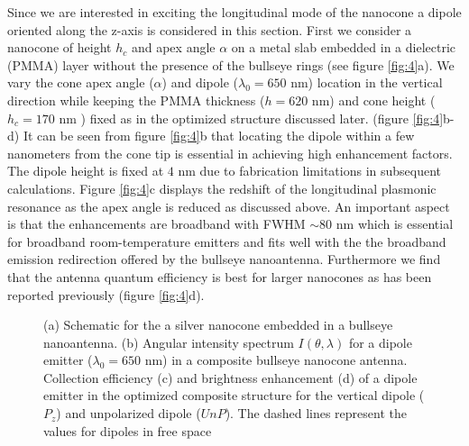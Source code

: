 \documentclass[10pt,onecolumn ]{article}
\begin{document}
Since we are interested in exciting the longitudinal mode of the nanocone a dipole oriented along the z-axis is considered in this section. 
First we consider a nanocone of height $h_c$ and apex angle $\alpha$ on a metal slab embedded in a dielectric (PMMA) layer without the presence of the bullseye rings (see figure \ref{fig:4}a).
We vary the cone apex angle ($\alpha$) and dipole ($\lambda_0 = 650$ nm) location in the vertical direction while keeping the PMMA thickness ($h= 620$ nm) and cone height ($h_c = 170$ nm ) fixed as in the optimized structure discussed later. (figure \ref{fig:4}b-d)
It can be seen from figure \ref{fig:4}b that locating the dipole within a few nanometers from the cone tip is essential in achieving high enhancement factors.
The dipole height is fixed at $4$ nm due to fabrication limitations in subsequent calculations.
Figure \ref{fig:4}c displays the redshift of the longitudinal plasmonic resonance as the apex angle is reduced as discussed above. 
An important aspect is that the enhancements are broadband with FWHM $\sim80$ nm which is essential for broadband room-temperature emitters and fits well with the the broadband emission redirection offered by the bullseye nanoantenna. 
Furthermore we find that the antenna quantum efficiency is best for larger nanocones as has been reported previously (figure \ref{fig:4}d). \cite{DAgostino2013DipoleNanocones,Mohammadi2010FluorescenceAntenna}
\begin{figure}[t!]
\caption{(a) Schematic for the a silver nanocone embedded in a bullseye nanoantenna. (b) Angular intensity spectrum $I(\theta,\lambda)$  for a dipole emitter ($\lambda_0=650$ nm) in a composite bullseye nanocone antenna. Collection efficiency   (c) and brightness enhancement (d) of a dipole emitter in the optimized composite structure for the vertical dipole ($P_z$) and unpolarized dipole ($UnP$). The dashed lines represent the values for dipoles in free space }
\label{fig:5}
\end{figure}
\end{document}
